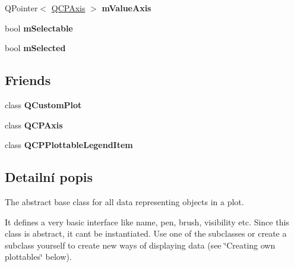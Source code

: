 \begin{DoxyCompactItemize}
\item 
\hypertarget{classQCPAbstractPlottable_a2901452ca4aea911a1827717934a4bda}{}Q\+Pointer$<$ \hyperlink{classQCPAxis}{Q\+C\+P\+Axis} $>$ {\bfseries m\+Value\+Axis}\label{classQCPAbstractPlottable_a2901452ca4aea911a1827717934a4bda}

\item 
\hypertarget{classQCPAbstractPlottable_aceee52342c8e75727abcbd164986fdcb}{}bool {\bfseries m\+Selectable}\label{classQCPAbstractPlottable_aceee52342c8e75727abcbd164986fdcb}

\item 
\hypertarget{classQCPAbstractPlottable_a43f68a0603e9bcd016bdfa6d9d5c41c9}{}bool {\bfseries m\+Selected}\label{classQCPAbstractPlottable_a43f68a0603e9bcd016bdfa6d9d5c41c9}

\end{DoxyCompactItemize}
\subsection*{Friends}
\begin{DoxyCompactItemize}
\item 
\hypertarget{classQCPAbstractPlottable_a1cdf9df76adcfae45261690aa0ca2198}{}class {\bfseries Q\+Custom\+Plot}\label{classQCPAbstractPlottable_a1cdf9df76adcfae45261690aa0ca2198}

\item 
\hypertarget{classQCPAbstractPlottable_af123edeca169ec7a31958a1d714e1a8a}{}class {\bfseries Q\+C\+P\+Axis}\label{classQCPAbstractPlottable_af123edeca169ec7a31958a1d714e1a8a}

\item 
\hypertarget{classQCPAbstractPlottable_a104c78e91302afd6842a903e472f552f}{}class {\bfseries Q\+C\+P\+Plottable\+Legend\+Item}\label{classQCPAbstractPlottable_a104c78e91302afd6842a903e472f552f}

\end{DoxyCompactItemize}


\subsection{Detailní popis}
The abstract base class for all data representing objects in a plot. 

It defines a very basic interface like name, pen, brush, visibility etc. Since this class is abstract, it can\textquotesingle{}t be instantiated. Use one of the subclasses or create a subclass yourself to create new ways of displaying data (see \char`\"{}\+Creating own plottables\char`\"{} below).

